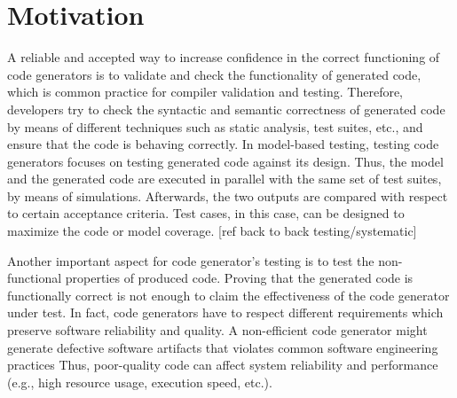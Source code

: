 \section{Motivation}

A reliable and accepted way to increase confidence in the correct functioning of code generators is to validate and check the functionality of generated code, which is common practice for compiler validation and testing.
Therefore, developers try to check the syntactic and semantic correctness of generated code by means of different techniques such as static analysis, test suites, etc., and ensure that the code is behaving correctly. 
In model-based testing, testing code generators focuses on testing generated code against its design. Thus, the model and the generated code are executed in parallel with the same set of test suites, by means of simulations. Afterwards, the two outputs are compared with respect to certain acceptance criteria. Test cases, in this case, can be designed to maximize the code or model coverage. [ref back to back testing/systematic]


Another important aspect for code generator's testing is to test the non-functional properties of produced code. Proving that the generated code is functionally correct is not enough to claim the effectiveness of the code generator under test. 
In fact, code generators have to respect different requirements which preserve software reliability and quality. A non-efficient code generator might generate defective software artifacts that violates common software engineering practices Thus, poor-quality code can affect system reliability and performance (e.g., high resource usage, execution speed, etc.).


